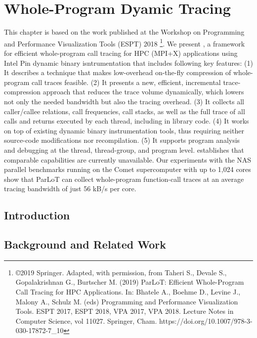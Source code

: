 
\chapter{Whole-Program Dyamic Tracing}
\label{sec:ch2}

This chapter is based on the work published at the Workshop on Programming and Performance Visualization Tools (ESPT) 2018 \cite{parlot}\footnote{\copyright 2019 Springer. Adapted, with permission, from Taheri S., Devale S., Gopalakrishnan G., Burtscher M. (2019) ParLoT: Efficient Whole-Program Call Tracing for HPC Applications. In: Bhatele A., Boehme D., Levine J., Malony A., Schulz M. (eds) Programming and Performance Visualization Tools. ESPT 2017, ESPT 2018, VPA 2017, VPA 2018. Lecture Notes in Computer Science, vol 11027. Springer, Cham. https://doi.org/10.1007/978-3-030-17872-7\_10}.
We present \parlot, a framework for efficient whole-program call tracing for HPC (MPI+X) applications using Intel Pin \cite{pin} dynamic binary isntrumentation that includes following key features: (1) It describes a technique that makes low-overhead on-the-fly compression of whole-program call traces feasible. (2) It presents a new, efficient, incremental trace-compression approach that reduces the trace volume dynamically, which lowers not only the needed bandwidth but also the tracing overhead. (3) It collects all caller/callee relations, call frequencies, call stacks, as well as the full trace of all calls and returns executed by each thread, including in library code. (4) It works on top of existing dynamic binary instrumentation tools, thus requiring neither source-code modifications nor recompilation. (5) It supports program analysis and debugging at the thread, thread-group, and program level.
\parlot establishes that comparable capabilities are currently unavailable. Our experiments with the NAS parallel benchmarks running on the Comet supercomputer with up to 1,024 cores show that ParLoT can collect whole-program function-call traces at an average tracing bandwidth of just 56 kB/s per core.


\section{Introduction}
\label{sec:ch2_intro}



\section{Background and Related Work}
\label{sec:ch2_bgreltool}


